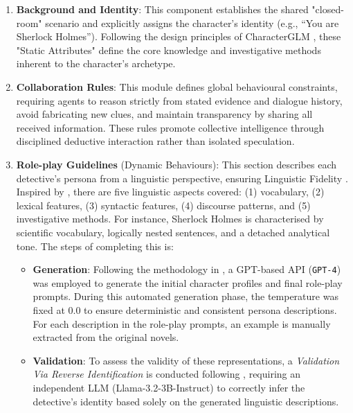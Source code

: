 \documentclass{article}
\begin{document}
\begin{enumerate}
    \item \textbf{Background and Identity}: This component establishes the shared "closed-room" scenario and explicitly assigns the character’s identity (e.g., “You are Sherlock Holmes”). Following the design principles of CharacterGLM \citep{zhou2023characterglm}, these "Static Attributes" define the core knowledge and investigative methods inherent to the character’s archetype.
    
    \item \textbf{Collaboration Rules}: This module defines global behavioural constraints, requiring agents to reason strictly from stated evidence and dialogue history, avoid fabricating new clues, and maintain transparency by sharing all received information. These rules promote collective intelligence through disciplined deductive interaction rather than isolated speculation.
    
    \item \textbf{Role-play Guidelines} (Dynamic Behaviours): This section describes each detective’s persona from a linguistic perspective, ensuring Linguistic Fidelity \citep{wang2024rolellm}. Inspired by \cite{delima2025detective}, there are five linguistic aspects covered: (1) vocabulary, (2) lexical features, (3) syntactic features, (4) discourse patterns, and (5) investigative methods. For instance, Sherlock Holmes is characterised by scientific vocabulary, logically nested sentences, and a detached analytical tone. The steps of completing this is:

    \begin{itemize}
    \item[Step 1] \textbf{Generation}: Following the methodology in \cite{delima2025detective}, a GPT-based API (\texttt{GPT-4}) was employed to generate the initial character profiles and final role-play prompts. During this automated generation phase, the temperature was fixed at 0.0 to ensure deterministic and consistent persona descriptions. For each description in the role-play prompts, an example is manually extracted from the original novels. 
    \item[Step 2] \textbf{Validation}: To assess the validity of these representations, a \textit{Validation Via Reverse Identification} is conducted following \cite{delima2025detective}, requiring an independent LLM (Llama-3.2-3B-Instruct) to correctly infer the detective's identity based solely on the generated linguistic descriptions.
    \end{itemize}


\end{enumerate}
\end{document}
